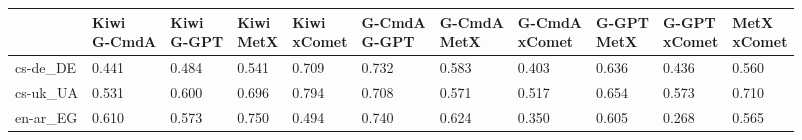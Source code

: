 \begin{tabular}{lllllllllll}
\toprule
 & \shortstack{Kiwi\\G-CmdA} & \shortstack{Kiwi\\G-GPT} & \shortstack{Kiwi\\MetX} & \shortstack{Kiwi\\xComet} & \shortstack{G-CmdA\\G-GPT} & \shortstack{G-CmdA\\MetX} & \shortstack{G-CmdA\\xComet} & \shortstack{G-GPT\\MetX} & \shortstack{G-GPT\\xComet} & \shortstack{MetX\\xComet} \\
\midrule
cs-de\_DE & \cellcolor[HTML]{E9F6A1}\textcolor[HTML]{000000}{0.441} & \cellcolor[HTML]{D9EF8B}\textcolor[HTML]{000000}{0.484} & \cellcolor[HTML]{BBE278}\textcolor[HTML]{000000}{0.541} & \cellcolor[HTML]{48AE5C}\textcolor[HTML]{000000}{0.709} & \cellcolor[HTML]{36A657}\textcolor[HTML]{FFFFFF}{0.732} & \cellcolor[HTML]{A2D76A}\textcolor[HTML]{000000}{0.583} & \cellcolor[HTML]{FAFDB8}\textcolor[HTML]{000000}{0.403} & \cellcolor[HTML]{7FC866}\textcolor[HTML]{000000}{0.636} & \cellcolor[HTML]{ECF7A6}\textcolor[HTML]{000000}{0.436} & \cellcolor[HTML]{AFDD70}\textcolor[HTML]{000000}{0.560} \\
cs-uk\_UA & \cellcolor[HTML]{BFE47A}\textcolor[HTML]{000000}{0.531} & \cellcolor[HTML]{98D368}\textcolor[HTML]{000000}{0.600} & \cellcolor[HTML]{54B45F}\textcolor[HTML]{000000}{0.696} & \cellcolor[HTML]{128A49}\textcolor[HTML]{FFFFFF}{0.794} & \cellcolor[HTML]{48AE5C}\textcolor[HTML]{000000}{0.708} & \cellcolor[HTML]{A9DA6C}\textcolor[HTML]{000000}{0.571} & \cellcolor[HTML]{C7E77F}\textcolor[HTML]{000000}{0.517} & \cellcolor[HTML]{73C264}\textcolor[HTML]{000000}{0.654} & \cellcolor[HTML]{A9DA6C}\textcolor[HTML]{000000}{0.573} & \cellcolor[HTML]{48AE5C}\textcolor[HTML]{000000}{0.710} \\
en-ar\_EG & \cellcolor[HTML]{91D068}\textcolor[HTML]{000000}{0.610} & \cellcolor[HTML]{A9DA6C}\textcolor[HTML]{000000}{0.573} & \cellcolor[HTML]{279F53}\textcolor[HTML]{FFFFFF}{0.750} & \cellcolor[HTML]{D3EC87}\textcolor[HTML]{000000}{0.494} & \cellcolor[HTML]{30A356}\textcolor[HTML]{FFFFFF}{0.740} & \cellcolor[HTML]{87CB67}\textcolor[HTML]{000000}{0.624} & \cellcolor[HTML]{FFF2AA}\textcolor[HTML]{000000}{0.350} & \cellcolor[HTML]{93D168}\textcolor[HTML]{000000}{0.605} & \cellcolor[HTML]{FED27F}\textcolor[HTML]{000000}{0.268} & \cellcolor[HTML]{ADDC6F}\textcolor[HTML]{000000}{0.565} \\

\end{tabular}

